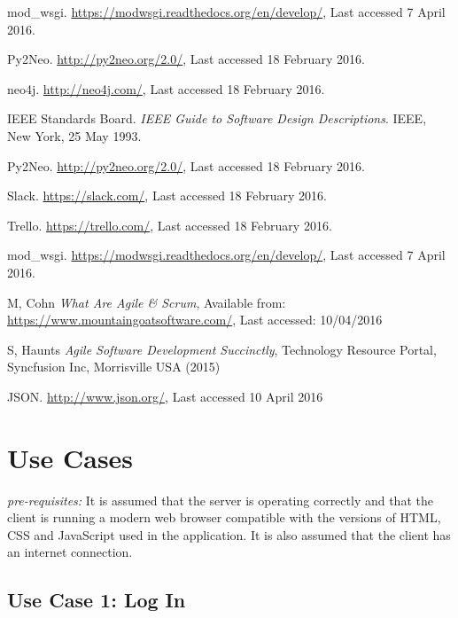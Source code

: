 \documentclass[12pt,onecolumn]{article}
\begin{document}
\begin{thebibliography}{1}
		 mod\_wsgi. \url{https://modwsgi.readthedocs.org/en/develop/}, Last accessed 7 April 2016.
		
		 Py2Neo. \url{http://py2neo.org/2.0/}, Last accessed 18 February 2016.
		
		 neo4j. \url{http://neo4j.com/}, Last accessed 18 February 2016.
		
		 IEEE Standards Board. \emph{IEEE Guide to Software Design Descriptions}. IEEE, New York, 25 May 1993.
		
		 Py2Neo. \url{http://py2neo.org/2.0/}, Last accessed 18 February 2016.
		
		 Slack. \url{https://slack.com/}, Last accessed 18 February 2016.
		
		 Trello. \url{https://trello.com/}, Last accessed 18 February 2016.
		
		 mod\_wsgi. \url{https://modwsgi.readthedocs.org/en/develop/}, Last accessed 7 April 2016.
		
		
		 M, Cohn \emph{What Are Agile \& Scrum}, Available from: \url{https://www.mountaingoatsoftware.com/}, Last accessed: 10/04/2016
		
		 S, Haunts \emph{Agile Software Development Succinctly}, Technology Resource Portal, Syncfusion Inc, Morrisville USA (2015)
		
		 JSON. \url{http://www.json.org/}, Last accessed 10 April 2016
		
		
	\end{thebibliography}
	
	\newpage
	
	\appendix
	
	\section{Use Cases} \label{moreusecase}
	
	\emph{pre-requisites:} It is assumed that the server is operating correctly and that the client is running a modern web browser compatible with the versions of HTML, CSS and JavaScript used in the application. It is also assumed that the client has an internet connection.
	
	\subsection{Use Case 1: Log In}
\end{document}
